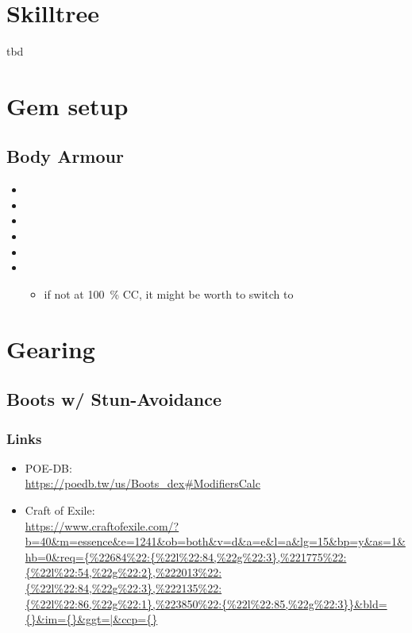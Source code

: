 \section{Skilltree}
tbd


\section{Gem setup}
\subsection{Body Armour}
\label{sec:BS_PurityOfElements_GemSetup_BodyArmour}
\begin{itemize}
	\item {}
	\item {}
	\item {}
	\item {}
	\item {}
	\item {}
	\begin{itemize}	
		\item if not at \SI{100}{\percent} CC, it might be worth to switch to 
	\end{itemize}	
\end{itemize}



\section{Gearing}
\subsection{Boots w/ Stun-Avoidance}
\subsubsection{Links}
\begin{itemize}
	\item POE-DB:\\
		\url{https://poedb.tw/us/Boots_dex#ModifiersCalc}
	
	\item Craft of Exile:\\
		\url{https://www.craftofexile.com/?b=40&m=essence&e=1241&ob=both&v=d&a=e&l=a&lg=15&bp=y&as=1&hb=0&req={%
\end{itemize}

